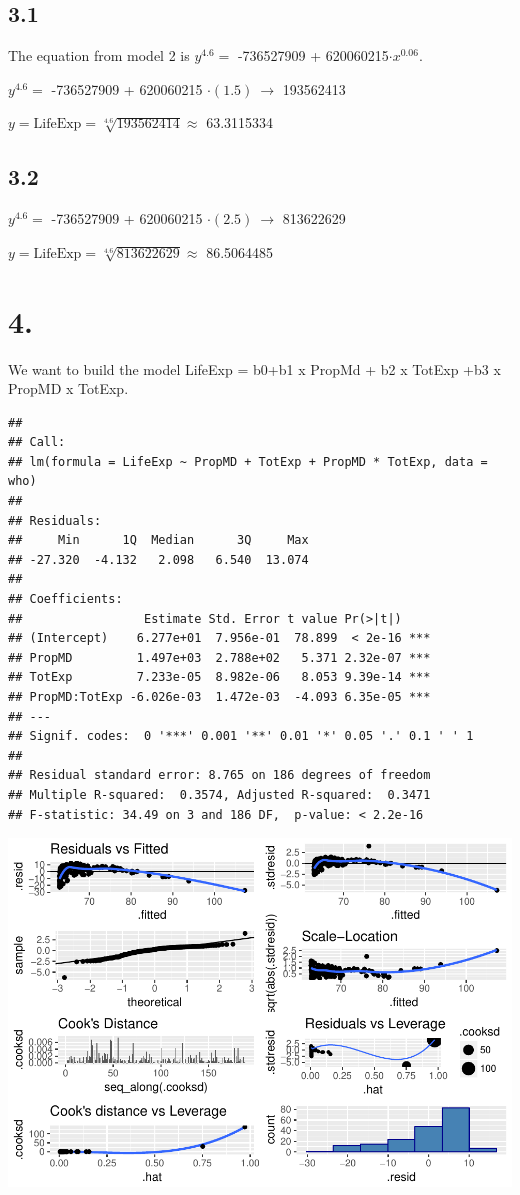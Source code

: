 \documentclass[]{article}
\begin{document}
\subsection{3.1}\label{section-3}

The equation from model 2 is \(y^{4.6} =\) -736527909 +
620060215\(\cdot x^{0.06}\).

\(y^{4.6} =\) -736527909 + 620060215 \(\cdot (1.5) \ \to\) 193562413

\(y = \text{LifeExp} = \sqrt[4.6]{193562414} \approx\) 63.3115334

\subsection{3.2}\label{section-4}

\(y^{4.6} =\) -736527909 + 620060215 \(\cdot (2.5) \ \to\) 813622629

\(y = \text{LifeExp} = \sqrt[4.6]{813622629} \approx\) 86.5064485

\section{4.}\label{section-5}

We want to build the model LifeExp = b0+b1 x PropMd + b2 x TotExp +b3 x
PropMD x TotExp.

\begin{verbatim}
## 
## Call:
## lm(formula = LifeExp ~ PropMD + TotExp + PropMD * TotExp, data = who)
## 
## Residuals:
##     Min      1Q  Median      3Q     Max 
## -27.320  -4.132   2.098   6.540  13.074 
## 
## Coefficients:
##                 Estimate Std. Error t value Pr(>|t|)    
## (Intercept)    6.277e+01  7.956e-01  78.899  < 2e-16 ***
## PropMD         1.497e+03  2.788e+02   5.371 2.32e-07 ***
## TotExp         7.233e-05  8.982e-06   8.053 9.39e-14 ***
## PropMD:TotExp -6.026e-03  1.472e-03  -4.093 6.35e-05 ***
## ---
## Signif. codes:  0 '***' 0.001 '**' 0.01 '*' 0.05 '.' 0.1 ' ' 1
## 
## Residual standard error: 8.765 on 186 degrees of freedom
## Multiple R-squared:  0.3574, Adjusted R-squared:  0.3471 
## F-statistic: 34.49 on 3 and 186 DF,  p-value: < 2.2e-16
\end{verbatim}

\includegraphics{JSturm_Assignment_12_files/figure-latex/model-three-1.pdf}
\end{document}
